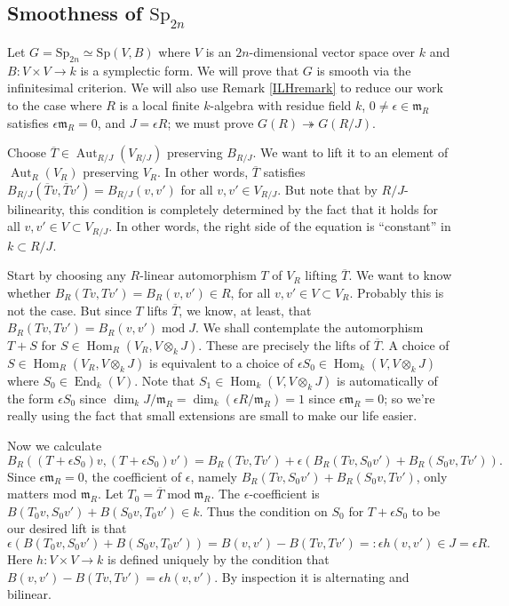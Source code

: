 \documentclass[10pt]{article}
\newcommand{\Hom}{\operatorname{Hom}}
\renewcommand{\(}{\left(}
\renewcommand{\)}{\right)}
\renewcommand{\bar}{\overline}
\newcommand{\End}{\operatorname{End}}
\DeclareMathOperator{\Aut}{Aut}
\renewcommand{\mod}{\operatorname{mod}}
\newcommand{\m}{\backslash}
\newcommand{\onto}{\twoheadrightarrow }
\newcommand{\dotimes}{\displaystyle\mathop{\otimes}}
\renewcommand{\m}{\mathfrak{m}}
\newcommand{\Sp}{\mathrm{Sp}}
\numberwithin{thm}{subsection}
\begin{document}
\subsection{Smoothness of $\Sp_{2n}$}\label{spsmooth}
Let $G=\Sp_{2n}\simeq\Sp(V,B)$
where $V$ is an $2n$-dimensional vector space
over $k$
and $B:V\times V\to k$ is a symplectic form.
We will prove that $G$ is smooth via the infinitesimal criterion.
We will also use Remark \ref{ILHremark}
to reduce our work to the case where $R$ is a local finite $k$-algebra
with residue field $k$,
$0\neq \epsilon\in \m_R$ satisfies
$\epsilon\m_R=0$,
and $J=\epsilon R$;
we must prove $G(R)\onto G(R/J)$.

Choose $\bar T\in \Aut_{R/J}(V_{R/J})$ preserving $B_{R/J}$.
We want to lift it to an element of $\Aut_R(V_R)$ preserving $V_R$.
In other words, $\bar T$ satisfies
$B_{R/J}(\bar T v,\bar T v')=B_{R/J}(v,v')$ for all $v,v'\in V_{R/J}$.
But note that by $R/J$-bilinearity, this condition is completely
determined by the fact that it holds for all $v,v'\in V\subset V_{R/J}$.
In other words, the right side of the equation is ``constant''
in $k\subset R/J$.

Start by choosing any $R$-linear automorphism $T$ of $V_R$ lifting $\bar T$.
We want to know whether $B_R(T v, Tv')=B_R(v,v')\in R$,
for all $v,v'\in V\subset V_R$.
Probably this is not the case.
But since $T$ lifts $\bar T$,
we know, at least, that $B_R(Tv, T v')=B_R(v,v')\mod J$.
We shall contemplate
the automorphism $T+S$ for $S\in \Hom_R(V_R,V\dotimes_k J)$.
These are precisely the lifts of $\bar T$.
A choice of $S\in \Hom_R(V_R,V\dotimes_k J)$ is equivalent to a choice
of $\epsilon S_0\in \Hom_k(V, V\dotimes_k J)$ where $S_0\in \End_k(V)$.
Note that $S_1\in\Hom_k(V,V\dotimes_kJ)$ is automatically of the form $\epsilon S_0$ since $\dim_k J/\m_R = \dim_k (\epsilon R/\m_R)=1$ since $\epsilon \m_R=0$;
so we're really using the fact that small extensions are small
to make our life easier.

Now we calculate
\[B_R((T+\epsilon S_0)v,(T+\epsilon S_0)v')=B_R(Tv,Tv')+\epsilon(B_R(Tv, S_0v')+B_R(S_0v, Tv')).\]
Since $\epsilon\m_R=0$, the coefficient
of $\epsilon$, namely
$B_R(Tv,S_0v')+B_R(S_0v,Tv')$, only matters mod $\m_R$.
Let $T_0=\bar T\mod \m_R$.
The $\epsilon$-coefficient
is $B(T_0v,S_0v')+B(S_0v,T_0v')\in k$.
Thus the condition on $S_0$ for $T+\epsilon S_0$ to be our desired
lift is that
\[\epsilon(B(T_0v,S_0v')+B(S_0v,T_0v'))=B(v,v')-B(Tv,Tv')=:\epsilon h(v,v')\in J=\epsilon R.\]
Here $h:V\times V\to k$ is defined uniquely
by the condition that $B(v,v')-B(Tv,Tv')=\epsilon h(v,v')$.
By inspection it is alternating and bilinear.
\end{document}
